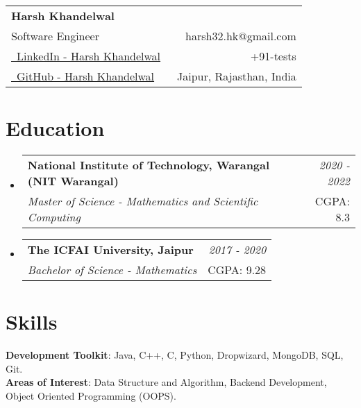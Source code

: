 \documentclass[a4paper,12pt]{article}
\makeatletter
\newcommand{\resumeSubheading}[4]{
\vspace{0.5mm}\item[]
    \begin{tabular*}{0.98\textwidth}[t]{l@{\extracolsep{\fill}}r}
        \textbf{#1} & \textit{\footnotesize{#4}} \\
        \textit{\footnotesize{#3}} &  \footnotesize{#2}\\
    \end{tabular*}
    \vspace{-1.0mm}
}
\newcommand{\resumeSubHeadingListStart}{\begin{itemize}[leftmargin=*,labelsep=0mm]}
\newcommand{\resumeSubHeadingListEnd}{\end{itemize}\vspace{2mm}}
\newcommand{\name}{Harsh Khandelwal} %
\newcommand{\phone}{tests} %
\newcommand{\emaila}{harsh32.hk@gmail.com} %
\makeatother
\begin{document}


\parbox{\dimexpr\linewidth-0.5cm\relax}{
\begin{tabularx}{\linewidth}{L r} \\
  \textbf{\Large \name}\\
  {Software Engineer} & \raisebox{0.0\height}{\footnotesize \faEnvelope}\ {\emaila} \\
  \href{https://www.linkedin.com/in/harsh-khandelwal-094866201/}{\raisebox{0.0\height}{\footnotesize \faLinkedin}\ LinkedIn - Harsh Khandelwal} &  {\raisebox{0.0\height}{\footnotesize \faPhone}\ +91-\phone} \\
  \href{https://github.com/redhlk}{\raisebox{0.0\height}{\footnotesize \faGithub}\ {GitHub - \name}}
  & {\raisebox{0.0\height}{\footnotesize}\ Jaipur, Rajasthan, India}\\
\end{tabularx}
}

\section{\textbf{Education}}
  \resumeSubHeadingListStart
    \resumeSubheading
      {National Institute of Technology, Warangal (NIT Warangal)}{CGPA: 8.3}
      {Master of Science - Mathematics and Scientific Computing }{2020 - 2022}
    \resumeSubheading
      {The ICFAI University, Jaipur}{CGPA: 9.28}
      {Bachelor of Science - Mathematics}{2017 - 2020}
  \resumeSubHeadingListEnd
\vspace{-5.5mm}
%


\section{\textbf{Skills}}
 \begin{itemize}[leftmargin=0.05in, label={}]
    \small{\item{
     \textbf{Development Toolkit}{: Java, C++, C, Python, Dropwizard, MongoDB, SQL, Git.} \\
         \vspace{2pt}
     \textbf{Areas of Interest}{: Data Structure and Algorithm, Backend Development, Object Oriented Programming (OOPS).}
    }}
 \end{itemize}
 \vspace{-12pt}
\end{document}
